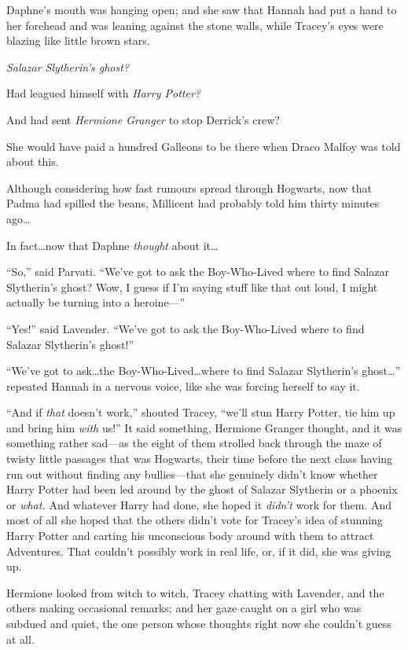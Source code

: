 Daphne’s mouth was hanging open; and she saw that Hannah had put a hand to her
forehead and was leaning against the stone walls, while Tracey’s eyes were
blazing like little brown stars.

\emph{Salazar Slytherin’s ghost?}

Had leagued himself with \emph{Harry Potter?}

And had sent \emph{Hermione Granger} to stop Derrick’s crew?

She would have paid a hundred Galleons to be there when Draco Malfoy was told
about this.

Although considering how fast rumours spread through Hogwarts, now that Padma
had spilled the beans, Millicent had probably told him thirty minutes
ago…

In fact…now that Daphne \emph{thought} about it…

“So,” said Parvati. “We’ve got to ask the Boy-Who-Lived where to find Salazar
Slytherin’s ghost? Wow, I guess if I’m saying stuff like that out loud, I might
actually be turning into a heroine—”

“Yes!” said Lavender. “We’ve got to ask the Boy-Who-Lived where to find Salazar
Slytherin’s ghost!”

“We’ve got to ask…the Boy-Who-Lived…where to find Salazar
Slytherin’s ghost…” repeated Hannah in a nervous voice, like she was
forcing herself to say it.

“And if \emph{that} doesn’t work,” shouted Tracey, “we’ll stun Harry Potter,
tie him up and bring him \emph{with} us!”
\later
It said something, Hermione Granger thought, and it was something rather
sad—as the eight of them strolled back through the maze of twisty little
passages that was Hogwarts, their time before the next class having run out
without finding any bullies—that she genuinely didn’t know whether Harry
Potter had been led around by the ghost of Salazar Slytherin or a phoenix or
\emph{what.} And whatever Harry had done, she hoped it \emph{didn’t} work for
them. And most of all she hoped that the others didn’t vote for Tracey’s idea
of stunning Harry Potter and carting his unconscious body around with them to
attract Adventures. That couldn’t possibly work in real life, or, if it did,
she was giving up.

Hermione looked from witch to witch, Tracey chatting with Lavender, and the
others making occasional remarks; and her gaze caught on a girl who was subdued
and quiet, the one person whose thoughts right now she couldn’t guess at all.

